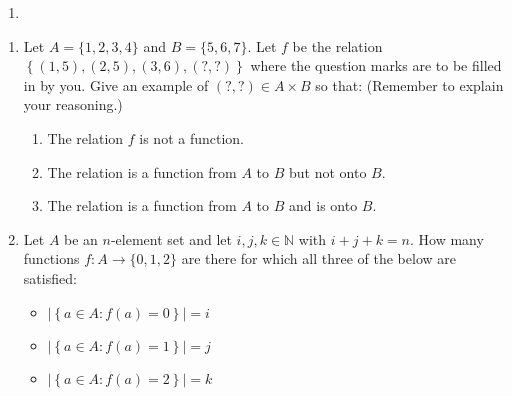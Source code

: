 \documentclass{article}
\newcommand{\Z}{\mathbb{Z}}
\newcommand{\N}{\mathbb{N}}
\theoremstyle{definition}
\begin{document}
\begin{solution}
\begin{enumerate}
(Not surjective) Let $y\in\N$. Assume, for the sake of contradiction, there exists $x\in\N$ such that $f(x)=y$. Then $x$ is even or $x$ is odd.

Suppose $x$ is even. Then there exists $k\in\Z$ such that $x=2k$. So $y=f(2k)=2^{2k}$. Thus $y=4^k$, so $k=\log_4{y}$. But $k$ is an arbitrary integer, and $\log_4{y}$ where $y\in\N$ is not necessarily an integer. This is absurd.

Thus our assumption is false: There does not necessarily exist $x\in\N$ such that $f(x)=y$. There is a case where $f$ is not surjective. Therefore, $f$ is not surjective.\newline

Hence, $f$ is neither injective nor surjective.$~\square$
\item 
\end{enumerate}
\end{solution}
\begin{question}
    \begin{enumerate}
        \item Let $A = \{1,2,3,4\}$ and $B = \{5,6,7\}$.
        Let $f$ be the relation $ \left\{(1,5),(2,5),(3,6),(?,?)\right\} $ where the question marks are to be filled in by you. 
        Give an example of $(?,?) \in A \times B$ so that: (Remember to explain your reasoning.)
            \begin{enumerate}
                \item The relation $f$ is not a function.
                \item The relation is a function from $A$ to $B$ but not onto $B$.
                \item The relation is a function from $A$ to $B$ and is onto $B$.
            \end{enumerate}

        \item     Let $A$ be an $n$-element set and let $i, j, k \in \mathbb{N}$ with $i+j+k = n$.
        How many functions $f \colon A \to \{0,1,2\}$ are there for which all three of the below are satisfied:
            \begin{itemize}
                \item $\left|\left\{ a \in A : f(a) = 0 \right\} \right| = i$
                \item $\left|\left\{ a \in A : f(a) = 1 \right\} \right| = j$
                \item $\left|\left\{ a \in A : f(a) = 2 \right\} \right| = k$
            \end{itemize}
    \end{enumerate}
\end{question}
\begin{solution}
\end{solution}
\end{document}
